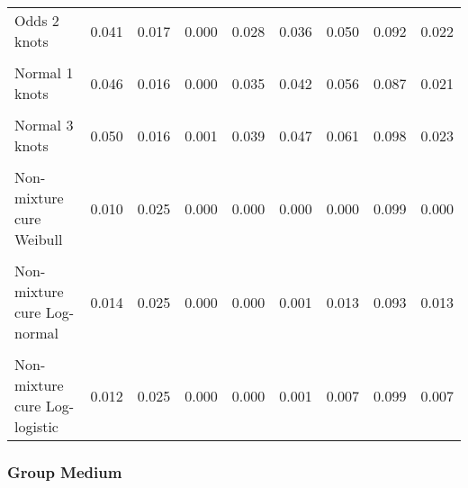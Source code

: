 \documentclass[
]{article}
\begin{document}
\begin{table}[H]
{\begin{tabular}[t]{lrrrrrrrr}
Odds 2 knots & 0.041 & 0.017 & 0.000 & 0.028 & 0.036 & 0.050 & 0.092 & 0.022\\
\cellcolor{gray!10}{Odds 3 knots} & \cellcolor{gray!10}{0.050} & \cellcolor{gray!10}{0.018} & \cellcolor{gray!10}{0.000} & \cellcolor{gray!10}{0.036} & \cellcolor{gray!10}{0.047} & \cellcolor{gray!10}{0.064} & \cellcolor{gray!10}{0.100} & \cellcolor{gray!10}{0.028}\\
Normal 1 knots & 0.046 & 0.016 & 0.000 & 0.035 & 0.042 & 0.056 & 0.087 & 0.021\\
\cellcolor{gray!10}{Normal 2 knots} & \cellcolor{gray!10}{0.040} & \cellcolor{gray!10}{0.017} & \cellcolor{gray!10}{0.000} & \cellcolor{gray!10}{0.028} & \cellcolor{gray!10}{0.035} & \cellcolor{gray!10}{0.048} & \cellcolor{gray!10}{0.095} & \cellcolor{gray!10}{0.019}\\
Normal 3 knots & 0.050 & 0.016 & 0.001 & 0.039 & 0.047 & 0.061 & 0.098 & 0.023\\
\cellcolor{gray!10}{Mixture cure Weibull} & \cellcolor{gray!10}{0.010} & \cellcolor{gray!10}{0.025} & \cellcolor{gray!10}{0.000} & \cellcolor{gray!10}{0.000} & \cellcolor{gray!10}{0.000} & \cellcolor{gray!10}{0.000} & \cellcolor{gray!10}{0.099} & \cellcolor{gray!10}{0.000}\\
Non-mixture cure Weibull & 0.010 & 0.025 & 0.000 & 0.000 & 0.000 & 0.000 & 0.099 & 0.000\\
\cellcolor{gray!10}{Mixture cure Log-normal} & \cellcolor{gray!10}{0.014} & \cellcolor{gray!10}{0.025} & \cellcolor{gray!10}{0.000} & \cellcolor{gray!10}{0.000} & \cellcolor{gray!10}{0.001} & \cellcolor{gray!10}{0.012} & \cellcolor{gray!10}{0.093} & \cellcolor{gray!10}{0.011}\\
Non-mixture cure Log-normal & 0.014 & 0.025 & 0.000 & 0.000 & 0.001 & 0.013 & 0.093 & 0.013\\
\cellcolor{gray!10}{Mixture cure Log-logistic} & \cellcolor{gray!10}{0.012} & \cellcolor{gray!10}{0.025} & \cellcolor{gray!10}{0.000} & \cellcolor{gray!10}{0.000} & \cellcolor{gray!10}{0.001} & \cellcolor{gray!10}{0.007} & \cellcolor{gray!10}{0.099} & \cellcolor{gray!10}{0.007}\\
Non-mixture cure Log-logistic & 0.012 & 0.025 & 0.000 & 0.000 & 0.001 & 0.007 & 0.099 & 0.007\\
\bottomrule
\end{tabular}}
\end{table}

\clearpage

\subsubsection{Group Medium}\label{group-medium}
\end{document}

